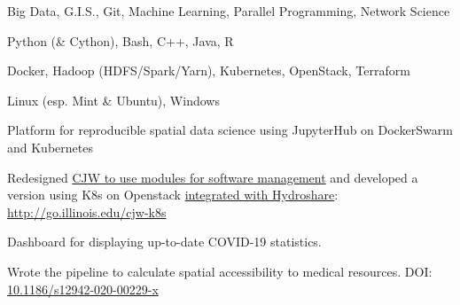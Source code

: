 \documentclass{acmresume}
\begin{document}
        \begin{titemize}
        \end{titemize}
		
        \begin{titemize}
        \end{titemize}
    
        \begin{description}[topsep=1pt,itemsep=1pt]
        	 Big Data, G.I.S., Git, Machine Learning, Parallel Programming, Network Science
        	
        	 Python (\& Cython), Bash, C++, Java, R
        	
        	 Docker, Hadoop (HDFS/Spark/Yarn), Kubernetes, OpenStack, Terraform
        	
        	 Linux (esp. Mint \& Ubuntu), Windows
        \end{description}
    
    
    
    \begin{titemize}
    	\item Platform for reproducible spatial data science using JupyterHub on DockerSwarm and Kubernetes
    	\item Redesigned \href{https://www.hydroshare.org/resource/4cfd280e8eb747169b293aec2862d4f5/}{CJW to use modules for software management} and developed a version using K8s on Openstack \href{https://www.hydroshare.org/resource/e9686eadd4474b6587d83d9330d25854/}{integrated with Hydroshare}: \href{http://go.illinois.edu/cjw-k8s}{http://go.illinois.edu/cjw-k8s}
    \end{titemize}
    
    \begin{titemize}
    	\item Dashboard for displaying up-to-date COVID-19 statistics.
    	\item Wrote the pipeline to calculate spatial accessibility to medical resources. DOI: \href{https://doi.org/10.1186/s12942-020-00229-x}{10.1186/s12942-020-00229-x}
    \end{titemize}

	
\end{document}
